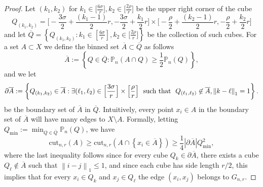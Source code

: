 \documentclass[11pt,twoside]{article}
\newcommand{\set}[1]{\left\{#1\right\}}
\newcommand{\cut}{\mathrm{cut}}
\newcommand{\abs}[1]{\left \lvert #1 \right \rvert}
\newcommand{\norm}[1]{\left\lVert#1\right\rVert}
\newcommand{\1}{\mathbbm{1}}
\newcommand{\Pbb}{\mathbb{P}}
\begin{document}
\begin{proof}
	Let $(k_1,k_2)$ for $k_1 \in \bigl[\frac{6\sigma}{r}\bigr], k_2 \in \bigl[\frac{2\rho}{r}\bigr]$ be the upper right  corner of the cube
	\begin{equation*}
	Q_{(k_1,k_2)} = \biggl[-\frac{3\sigma}{2} + \frac{(k_1 - 1)}{2}r, -\frac{3\sigma}{2} + \frac{k_1}{2}r\biggr] \times \biggl[-\frac{\rho}{2} + \frac{(k_2 - 1)}{2}r, -\frac{\rho}{2} + \frac{k_2}{2}r\biggr]
	\end{equation*}
	and let $\overline{Q} = \set{Q_{(k_1,k_2)}: k_1 \in \left[\frac{6\sigma}{r}\right], k_2 \in \bigl[\frac{2\rho}{r}\bigr]}$ be the collection of such cubes. For a set $A \subset X$ we define the binned set $\overline{A} \subset \overline{Q}$ as follows
	\begin{equation*}
	\overline{A} := \set{Q \in \overline{Q}: \Pbb_n(A \cap Q) \geq \frac{1}{2}\Pbb_n(Q)},
	\end{equation*}
	and we let 
	\begin{equation*}
	\partial \overline{A} := \set{Q_{(k_1,k_2)} \in \overline{A}: \exists (\ell_1,\ell_2) \in \Bigl[\frac{3\sigma}{r}\Bigr] \times \Bigl[\frac{\rho}{r}\Bigr]~~\textrm{such that}~~Q_{(\ell_1,\ell_2)} \not\in \overline{A}, \norm{k - \ell}_1 = 1}.
	\end{equation*}
	be the boundary set of $\overline{A}$ in $\overline{Q}$. Intuitively, every point $x_i \in A$ in the boundary set of $\overline{A}$ will have many edges to $X\setminus A$. Formally, letting $Q_{\min} := \min_{Q \in \overline{Q}} \Pbb_n(Q)$, we have
	\begin{equation}
	\label{eqn:normalized_cut_lb_pf1}
	\cut_{n,r}(A) \geq \cut_{n,r}(A \cap \set{x_i \in \overline{A}}) \geq \frac{1}{4} \abs{\partial \overline{A}} Q_{\min}^2,
	\end{equation}
	where the last inequality follows since for every cube $Q_k \in \partial\overline{A}$, there exists a cube $Q_\ell \not\in \overline{A}$ such that $\norm{i - j}_1 \leq 1$, and since each cube has side length $r/2$, this implies that for every $x_i \in Q_k$ and $x_j \in Q_\ell$ the edge $(x_i,x_j)$ belongs to $G_{n,r}$. 
	

\end{proof}
\end{document}
